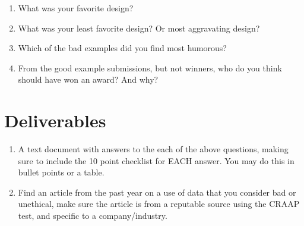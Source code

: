 \documentclass[12pt]{article}
\begin{document}
    \begin{enumerate}
        \item What was your favorite design?
        \item What was your least favorite design? Or most aggravating design?
        \item Which of the bad examples did you find most humorous?
        \item From the good example submissions, but not winners, who do you think should have won an award? And why?
    \end{enumerate}



\section*{Deliverables}
\begin{enumerate}
    \item A text document with answers to the each of the above questions, making sure to include the 10 point checklist for EACH answer.  You may do this in bullet points or a table.
    \item Find an article from the past year on a use of data that you consider bad or unethical, make sure the article is from a reputable source using the CRAAP test, and specific to a company/industry.
\end{enumerate}
\end{document}
